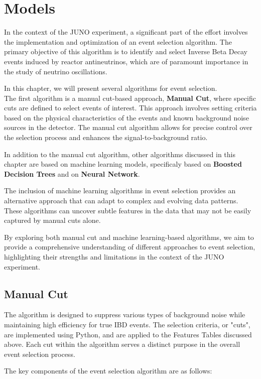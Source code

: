 \section{Models}
In the context of the JUNO experiment, a significant part of the effort involves the implementation and optimization of an event selection algorithm. The primary objective of this algorithm is to identify and select Inverse Beta Decay events induced by reactor antineutrinos, which are of paramount importance in the study of neutrino oscillations.

In this chapter, we will present several algorithms for event selection.\\
 
 The first algorithm is a manual cut-based approach, \textbf{Manual Cut}, where specific cuts are defined to select events of interest. This approach involves setting criteria based on the physical characteristics of the events and known background noise sources in the detector. The manual cut algorithm allows for precise control over the selection process and enhances the signal-to-background ratio.

In addition to the manual cut algorithm, other algorithms discussed in this chapter are based on machine learning models, specificaly based on \textbf{Boosted Decision Trees} and on \textbf{Neural Network}. 

The inclusion of machine learning algorithms in event selection provides an alternative approach that can adapt to complex and evolving data patterns. These algorithms can uncover subtle features in the data that may not be easily captured by manual cuts alone.

By exploring both manual cut and machine learning-based algorithms, we aim to provide a comprehensive understanding of different approaches to event selection, highlighting their strengths and limitations in the context of the JUNO experiment.

\subsection{Manual Cut}
The algorithm is designed to suppress various types of background noise while maintaining high efficiency for true IBD events. The selection criteria, or "cuts", are implemented using Python, and are applied to the Features Tables discussed above. Each cut within the algorithm serves a distinct purpose in the overall event selection process.

The key components of the event selection algorithm are as follows:

